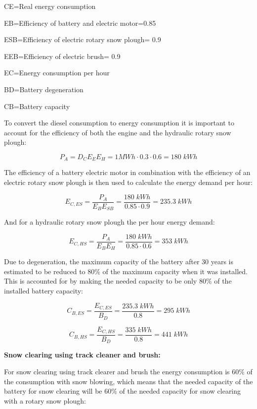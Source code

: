 \documentclass{article}
\begin{document}
CE=Real energy consumption

EB=Efficiency of battery and electric motor=0.85

ESB=Efficiency of electric rotary snow plough= 0.9

EEB=Efficiency of electric brush= 0.9

EC=Energy consumption per hour

BD=Battery degeneration

CB=Battery capacity

To convert the diesel consumption to energy consumption it is important to account for the efficiency of both the engine and the hydraulic rotary snow plough:

\begin{equation*}
    P_A = D_C E_E E_H = 1 MWh\cdot 0.3 \cdot 0.6 = 180\;kWh
\end{equation*}

The efficiency of a battery electric motor in combination with the efficiency of an electric rotary snow plough is then used to calculate the energy demand per hour:

\begin{equation*}
    E_{C, ES} = \frac{P_A}{E_B E_{SB}} = \frac{180\;kWh}{0.85\cdot 0.9}=235.3 \;kWh
\end{equation*}

And for a hydraulic rotary snow plough the per hour energy demand:

\begin{equation*}
    E_{C, HS} = \frac{P_A}{E_B E_{H}} = \frac{180\;kWh}{0.85\cdot 0.6}=353 \;kWh
\end{equation*}

Due to degeneration, the maximum capacity of the battery after 30 years is estimated to be reduced to 80\% of the maximum capacity when it was installed. This is accounted for by making the needed capacity to be only 80\% of the installed battery capacity:

\begin{equation*}
    C_{B, ES} = \frac{E_{C,ES}}{B_D} = \frac{235.3\;kWh}{0.8}=295 \;kWh
\end{equation*}

\begin{equation*}
    C_{B, HS} = \frac{E_{C,HS}}{B_D} = \frac{335\;kWh}{0.8}=441 \;kWh
\end{equation*}

\textbf{Snow clearing using track cleaner and brush:}

For snow clearing using track clearer and brush the energy consumption is 60\% of the consumption with snow blowing, which means that the needed capacity of the battery for snow clearing will be 60\% of the needed capacity for snow clearing with a rotary snow plough:
\end{document}
